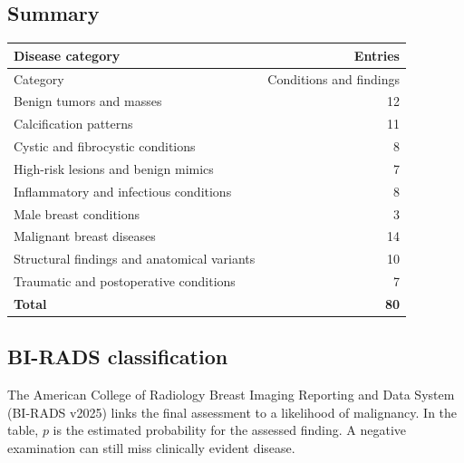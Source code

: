 \subsection{Summary}
\begin{center}
\begin{tabular}{@{}p{}r@{}}
\toprule
\textbf{Disease category} & \textbf{Entries} \\
\midrule
Category & Conditions and findings \\
Benign tumors and masses & 12 \\
Calcification patterns & 11 \\
Cystic and fibrocystic conditions & 8 \\
High-risk lesions and benign mimics & 7 \\
Inflammatory and infectious conditions & 8 \\
Male breast conditions & 3 \\
Malignant breast diseases & 14 \\
Structural findings and anatomical variants & 10 \\
Traumatic and postoperative conditions & 7 \\
\midrule
\textbf{Total} & \textbf{80} \\
\bottomrule
\end{tabular}
\end{center}

\subsection{BI-RADS classification}
The American College of Radiology Breast Imaging Reporting and Data System (BI-RADS v2025) links the final assessment to a likelihood of malignancy. In the table, $p$ is the estimated probability for the assessed finding. A negative examination can still miss clinically evident disease.

